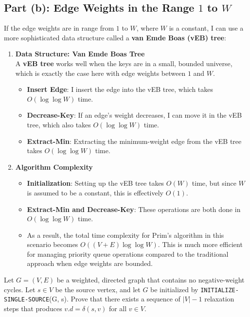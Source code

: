 \documentclass[10pt,letter,notitlepage]{article}
\newcounter{exercise}
\begin{document}
\begin{Answer}[]
\subsection*{Part (b): Edge Weights in the Range \(1\) to \(W\)}

If the edge weights are in range from \(1\) to \(W\), where \(W\) is a constant, I can use a more sophisticated data structure called a \textbf{van Emde Boas (vEB) tree}:

\begin{enumerate}
    \item \textbf{Data Structure: Van Emde Boas Tree} \\
    A \textbf{vEB tree} works well when the keys are in a small, bounded universe, which is exactly the case here with edge weights between \(1\) and \(W\).
    \begin{itemize}
        \item \textbf{Insert Edge}: I insert the edge into the vEB tree, which takes \(O(\log \log W)\) time.
        \item \textbf{Decrease-Key}: If an edge’s weight decreases, I can move it in the vEB tree, which also takes \(O(\log \log W)\) time.
        \item \textbf{Extract-Min}: Extracting the minimum-weight edge from the vEB tree takes \(O(\log \log W)\) time.
    \end{itemize}

    \item \textbf{Algorithm Complexity} \\
    \begin{itemize}
        \item \textbf{Initialization}: Setting up the vEB tree takes \(O(W)\) time, but since \(W\) is assumed to be a constant, this is effectively \(O(1)\).
        \item \textbf{Extract-Min and Decrease-Key}: These operations are both done in \(O(\log \log W)\) time.
        \item As a result, the total time complexity for Prim’s algorithm in this scenario becomes \(O((V + E) \log \log W)\). This is much more efficient for managing priority queue operations compared to the traditional approach when edge weights are bounded.
    \end{itemize}
\end{enumerate}


\end{Answer}

\begin{exercise}[(10 marks)]
Let \( G = (V, E) \) be a weighted, directed graph that contains no negative-weight cycles. Let \( s \in V \) be the source vertex, and let \( G \) be initialized by \texttt{INITIALIZE-SINGLE-SOURCE}(G, s). Prove that there exists a sequence of \( |V| - 1 \) relaxation steps that produces \( v.d = \delta(s, v) \) for all \( v \in V \).

\end{exercise}
\end{document}
